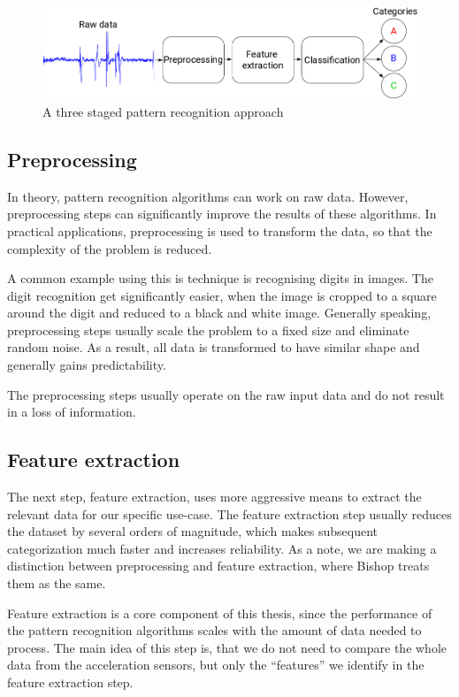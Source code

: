 \begin{figure}
    \centering
    \includegraphics[width=\textwidth]{figures/PatternRecognitionSteps.png}
    \caption{A three staged pattern recognition approach}
    \label{fig:patternrecognitionsteps}
\end{figure}

\subsection{Preprocessing}
In theory, pattern recognition algorithms can work on raw data. However, preprocessing steps can significantly improve the results of these algorithms. In practical applications, preprocessing is used to transform the data, so that the complexity of the problem is reduced. 

A common example using this is technique is recognising digits in images. The digit recognition get significantly easier, when the image is cropped to a square around the digit and reduced to a black and white image. Generally speaking, preprocessing steps usually scale the problem to a fixed size and eliminate random noise. As a result, all data is transformed to have similar shape and generally gains predictability.

The preprocessing steps usually operate on the raw input data and do not result in a loss of information.

\subsection{Feature extraction}
The next step, feature extraction, uses more aggressive means to extract the relevant data for our specific use-case. The feature extraction step usually reduces the dataset by several orders of magnitude, which makes subsequent categorization much faster and increases reliability. As a note, we are making a distinction between preprocessing and feature extraction, where Bishop \cite{bishop2006pattern} treats them as the same.

Feature extraction is a core component of this thesis, since the performance of the pattern recognition algorithms scales with the amount of data needed to process. The main idea of this step is, that we do not need to compare the whole data from the acceleration sensors, but only the ``features'' we identify in the feature extraction step.

